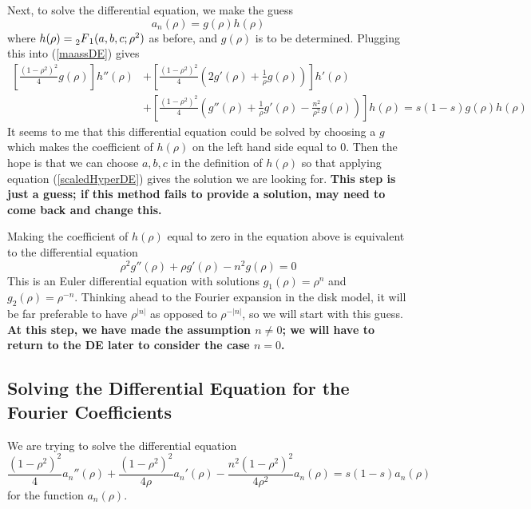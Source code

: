 \documentclass[]{article}
\begin{document}
Next, to solve the differential equation, we make the guess
$$
a_n(\rho) = g(\rho)h(\rho)
$$
where $h(\rho) = \prescript{}{2}{F}_1(a, b, c; \rho^2)$ as before, and $g(\rho)$ is to be determined.
Plugging this into (\ref{maassDE}) gives
$$
\begin{aligned}
\left[ \frac{(1-\rho^2)^2}{4}g(\rho) \right]h''(\rho) &+
\left[ \frac{(1-\rho^2)^2}{4}\left( 2g'(\rho) + \frac{1}{\rho}g(\rho) \right) \right]h'(\rho) \\
&+ \left[ \frac{(1-\rho^2)^2}{4}\left( g''(\rho) + \frac{1}{\rho}g'(\rho) - \frac{n^2}{\rho^2}g(\rho) \right) \right]h(\rho) = s(1-s)g(\rho)h(\rho)
\end{aligned}
$$
It seems to me that this differential equation could be solved by choosing a $g$ which makes the coefficient of $h(\rho)$ on the left hand side equal to $0$.
Then the hope is that we can choose $a, b, c$ in the definition of $h(\rho)$ so that applying equation (\ref{scaledHyperDE}) gives the solution we are looking for.
\textbf{This step is just a guess; if this method fails to provide a solution, may need to come back and change this.}

Making the coefficient of $h(\rho)$ equal to zero in the equation above is equivalent to the differential equation
$$
\rho^2g''(\rho) + \rho g'(\rho) - n^2g(\rho) = 0
$$
This is an Euler differential equation with solutions $g_1(\rho) = \rho^n$ and $g_2(\rho) = \rho^{-n}$.
Thinking ahead to the Fourier expansion in the disk model, it will be far preferable to have $\rho^{|n|}$ as opposed to $\rho^{-|n|}$, so we will start with this guess.
\textbf{At this step, we have made the assumption $n \neq 0$; we will have to return to the DE later to consider the case $n = 0$.}

\subsection*{Solving the Differential Equation for the Fourier Coefficients}

We are trying to solve the differential equation
\begin{equation}\label{maassDE}
\frac{(1-\rho^2)^2}{4}a_n''(\rho) + \frac{(1-\rho^2)^2}{4\rho}a_n'(\rho) - \frac{n^2(1-\rho^2)^2}{4\rho^2}a_n(\rho) = s(1-s)a_n(\rho)
\end{equation}
for the function $a_n(\rho)$.
\end{document}
